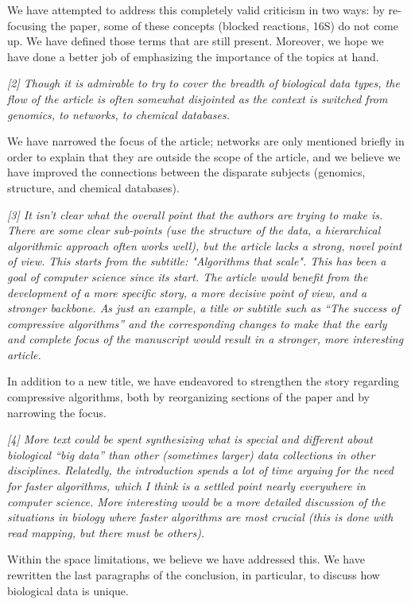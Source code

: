\documentclass[12pt]{letter}
\begin{document}
\begin{letter}{}
We have attempted to address this completely valid criticism in two ways: by
re-focusing the paper, some of these concepts (blocked reactions, 16S) do not come up. We have defined those terms that are still present. Moreover, we hope we have done a better job of emphasizing the importance of the topics at hand.


\emph{[2] Though it is admirable to try to cover the breadth of biological data
types, the flow of the article is often somewhat disjointed as the context is
switched from genomics, to networks, to chemical databases. }

We have narrowed the focus of the article; networks are only mentioned briefly in order to explain that they are outside the scope of the article, and we believe we have improved the connections between the disparate subjects (genomics, structure, and chemical databases).


\emph{[3] It isn't clear what the overall point that the authors are trying to make
is.  There are some clear sub-points (use the structure of the data, a
hierarchical algorithmic approach often works well), but the article lacks a
strong, novel point of view.  This starts from the subtitle: "Algorithms that
scale". This has been a goal of computer science since its start. The article
would benefit from the development of a more specific story, a more decisive
point of view, and a stronger backbone. As just an example, a title or subtitle
such as ``The success of compressive algorithms'' and the corresponding changes
to make that the early and complete focus of the manuscript would result in a
stronger, more interesting article.}

In addition to a new title, we have endeavored to strengthen the story regarding compressive algorithms, both by reorganizing sections of the paper and by narrowing the focus.


\emph{[4] More text could be spent synthesizing what is special and different about
biological ``big data'' than other (sometimes larger) data collections in other
disciplines.  Relatedly, the introduction spends a lot of time arguing for the
need for faster algorithms, which I think is a settled point nearly everywhere
in computer science. More interesting would be a more detailed discussion of
the situations in biology where faster algorithms are most crucial (this is
done with read mapping, but there must be others).}

Within the space limitations, we believe we have addressed this. We have rewritten the last paragraphs of the conclusion, in particular, to discuss how biological data is unique.


\end{letter}
\end{document}
